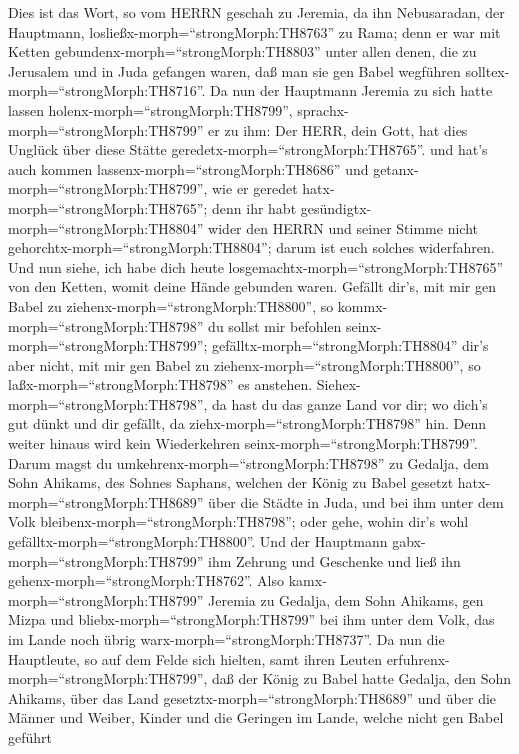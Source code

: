  Dies ist das Wort, so vom HERRN geschah zu Jeremia, da ihn
Nebusaradan, der Hauptmann, losließx-morph=``strongMorph:TH8763'' zu
Rama; denn er war mit Ketten gebundenx-morph=``strongMorph:TH8803''
unter allen denen, die zu Jerusalem und in Juda gefangen waren, daß man
sie gen Babel wegführen solltex-morph=``strongMorph:TH8716''.
 Da nun der Hauptmann Jeremia zu sich hatte lassen
holenx-morph=``strongMorph:TH8799'',
sprachx-morph=``strongMorph:TH8799'' er zu ihm: Der HERR, dein Gott, hat
dies Unglück über diese Stätte geredetx-morph=``strongMorph:TH8765''.
 und hat's auch kommen lassenx-morph=``strongMorph:TH8686''
und getanx-morph=``strongMorph:TH8799'', wie er geredet
hatx-morph=``strongMorph:TH8765''; denn ihr habt
gesündigtx-morph=``strongMorph:TH8804'' wider den HERRN und seiner
Stimme nicht gehorchtx-morph=``strongMorph:TH8804''; darum ist euch
solches widerfahren.  Und nun siehe, ich habe dich heute
losgemachtx-morph=``strongMorph:TH8765'' von den Ketten, womit deine
Hände gebunden waren. Gefällt dir's, mit mir gen Babel zu
ziehenx-morph=``strongMorph:TH8800'', so
kommx-morph=``strongMorph:TH8798'' du sollst mir befohlen
seinx-morph=``strongMorph:TH8799'';
gefälltx-morph=``strongMorph:TH8804'' dir's aber nicht, mit mir gen
Babel zu ziehenx-morph=``strongMorph:TH8800'', so
laßx-morph=``strongMorph:TH8798'' es anstehen.
Siehex-morph=``strongMorph:TH8798'', da hast du das ganze Land vor dir;
wo dich's gut dünkt und dir gefällt, da
ziehx-morph=``strongMorph:TH8798'' hin.  Denn weiter hinaus
wird kein Wiederkehren seinx-morph=``strongMorph:TH8799''. Darum magst
du umkehrenx-morph=``strongMorph:TH8798'' zu Gedalja, dem Sohn Ahikams,
des Sohnes Saphans, welchen der König zu Babel gesetzt
hatx-morph=``strongMorph:TH8689'' über die Städte in Juda, und bei ihm
unter dem Volk bleibenx-morph=``strongMorph:TH8798''; oder gehe, wohin
dir's wohl gefälltx-morph=``strongMorph:TH8800''. Und der Hauptmann
gabx-morph=``strongMorph:TH8799'' ihm Zehrung und Geschenke und ließ ihn
gehenx-morph=``strongMorph:TH8762''.  Also
kamx-morph=``strongMorph:TH8799'' Jeremia zu Gedalja, dem Sohn Ahikams,
gen Mizpa und bliebx-morph=``strongMorph:TH8799'' bei ihm unter dem
Volk, das im Lande noch übrig warx-morph=``strongMorph:TH8737''.
 Da nun die Hauptleute, so auf dem Felde sich hielten, samt
ihren Leuten erfuhrenx-morph=``strongMorph:TH8799'', daß der König zu
Babel hatte Gedalja, den Sohn Ahikams, über das Land
gesetztx-morph=``strongMorph:TH8689'' und über die Männer und Weiber,
Kinder und die Geringen im Lande, welche nicht gen Babel geführt
